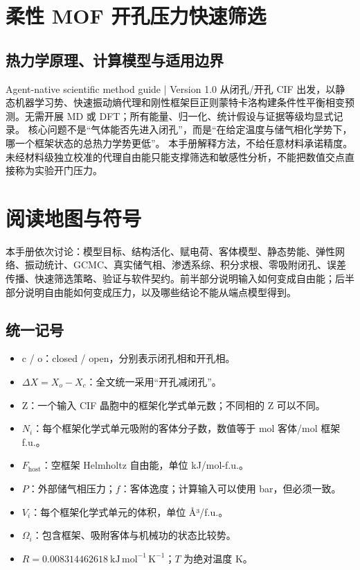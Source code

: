\documentclass[UTF8,a4paper,11pt]{ctexart}
\begin{document}
\section*{柔性 MOF 开孔压力快速筛选}
\subsection*{热力学原理、计算模型与适用边界}
Agent-native scientific method guide | Version 1.0
从闭孔/开孔 CIF 出发，以静态机器学习势、快速振动熵代理和刚性框架巨正则蒙特卡洛构建条件性平衡相变预测。无需开展 MD 或 DFT；所有能量、归一化、统计假设与证据等级均显式记录。
核心问题不是“气体能否先进入闭孔”，而是“在给定温度与储气相化学势下，哪一个框架状态的总热力学势更低”。
本手册解释方法，不给任意材料承诺精度。未经材料级独立校准的代理自由能只能支撑筛选和敏感性分析，不能把数值交点直接称为实验开门压力。
\clearpage
\section*{阅读地图与符号}
本手册依次讨论：模型目标、结构活化、赋电荷、客体模型、静态势能、弹性网络、振动统计、GCMC、真实储气相、渗透系综、积分求根、零吸附闭孔、误差传播、快速筛选策略、验证与软件契约。前半部分说明输入如何变成自由能；后半部分说明自由能如何变成压力，以及哪些结论不能从端点模型得到。
\subsection*{统一记号}
\begin{itemize}[leftmargin=1.7em,itemsep=0.15em,topsep=0.15em]
\item c / o：closed / open，分别表示闭孔相和开孔相。
\item \(\Delta X = X_o-X_c\)：全文统一采用“开孔减闭孔”。
\item Z：一个输入 CIF 晶胞中的框架化学式单元数；不同相的 Z 可以不同。
\item \(N_i\)：每个框架化学式单元吸附的客体分子数，数值等于 mol 客体/mol 框架 f.u.。
\item \(F_{\mathrm{host}}\)：空框架 Helmholtz 自由能，单位 kJ/mol-f.u.。
\item \(P\)：外部储气相压力；\(f\)：客体逸度；计算输入可以使用 bar，但必须一致。
\item \(V_i\)：每个框架化学式单元的体积，单位 Å³/f.u.。
\item \(\Omega_i\)：包含框架、吸附客体与机械功的状态比较势。
\item \(R=0.008314462618\ \mathrm{kJ\,mol^{-1}\,K^{-1}}\)；\(T\) 为绝对温度 K。
\end{itemize}
\end{document}

